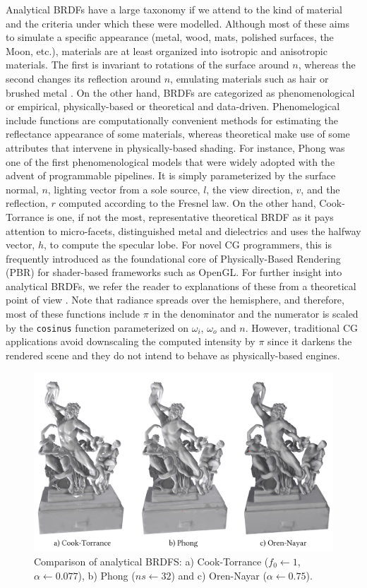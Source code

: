Analytical BRDFs have a large taxonomy if we attend to the kind of material and the criteria under which these were modelled. Although most of these aims to simulate a specific appearance (metal, wood, mats, polished surfaces, the Moon, etc.), materials are at least organized into isotropic and anisotropic materials. The first is invariant to rotations of the surface around $n$, whereas the second changes its reflection around $n$, emulating materials such as hair or brushed metal \cite{guarnera_brdf_2016}. On the other hand, BRDFs are categorized as phenomenological or empirical, physically-based or theoretical and data-driven. Phenomelogical include functions are computationally convenient methods for estimating the reflectance appearance of some materials, whereas theoretical make use of some attributes that intervene in physically-based shading. For instance, Phong was one of the first phenomenological models that were widely adopted with the advent of programmable pipelines. It is simply parameterized by the surface normal, $n$, lighting vector from a sole source, $l$, the view direction, $v$, and the reflection, $r$ computed according to the Fresnel law. On the other hand, Cook-Torrance is one, if not the most, representative theoretical BRDF as it pays attention to micro-facets, distinguished metal and dielectrics and uses the halfway vector, $h$, to compute the specular lobe. For novel CG programmers, this is frequently introduced as the foundational core of Physically-Based Rendering (PBR) for shader-based frameworks such as OpenGL. For further insight into analytical BRDFs, we refer the reader to explanations of these from a theoretical point of view \cite{guarnera_brdf_2016, soldado_overview_2012}. Note that radiance spreads over the hemisphere, and therefore, most of these functions include $\pi$ in the denominator and the numerator is scaled by the \verb|cosinus| function parameterized on $\omega_i$, $\omega_o$ and $n$. However, traditional CG applications avoid downscaling the computed intensity by $\pi$ since it darkens the rendered scene and they do not intend to behave as physically-based engines. 

\begin{figure}[!ht]
	\includegraphics[width=\textwidth]{figs/fundamentals/analytical_brdf.png}
	\caption{Comparison of analytical BRDFS: a) Cook-Torrance ($f_0 \gets 1$, $\alpha \gets 0.077$), b) Phong ($ns \gets 32$) and c) Oren-Nayar ($\alpha \gets 0.75$). }
    \label{fig:analytical_brdf}
\end{figure}

